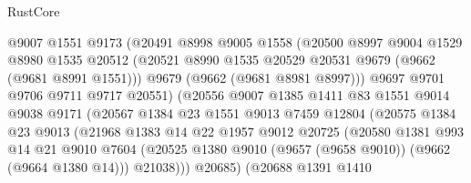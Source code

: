 \begin{lexlean}{RustCore}
\begin{coremodule}
                          @9007
                          @1551
                          @9173
                          (@20491
                            @8998
                            @9005
                            @1558
                            (@20500
                              @8997
                              @9004
                              @1529
                              @8980
                              @1535
                              @20512
                              (@20521 @8990 @1535 @20529 @20531 @9679 (@9662 (@9681 @8991 @1551)))
                              @9679
                              (@9662 (@9681 @8981 @8997)))
                            @9697
                            @9701
                            @9706
                            @9711
                            @9717
                            @20551)
                          (@20556
                            @9007
                            @1385
                            @1411
                            @83
                            @1551
                            @9014
                            @9038
                            @9171
                            (@20567
                              @1384
                              @23
                              @1551
                              @9013
                              @7459
                              @12804
                              (@20575
                                @1384
                                @23
                                @9013
                                (@21968
                                  @1383
                                  @14
                                  @22
                                  @1957
                                  @9012
                                  @20725
                                  (@20580
                                    @1381
                                    @993
                                    @14
                                    @21
                                    @9010
                                    @7604
                                    (@20525
                                      @1380
                                      @9010
                                      (@9657 (@9658 @9010))
                                      (@9662 (@9664 @1380 @14)))
                                    @21038)))
                              @20685)
                            (@20688
                              @1391
                              @1410

\end{coremodule}
\end{lexlean}

